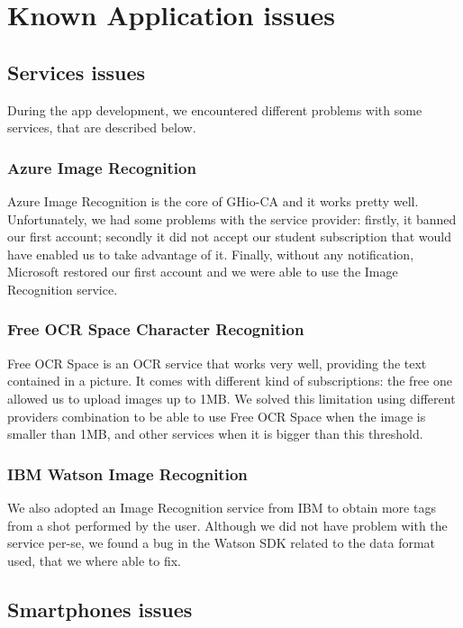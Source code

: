 \section{Known Application issues}
\label{sec:issues}

\subsection{Services issues}

During the app development, we encountered different problems with some services, 
that are described below.

\subsubsection{Azure Image Recognition}

Azure Image Recognition is the core of GHio-CA and it works pretty well. 
Unfortunately, we had some problems with the service provider: firstly, it 
banned our first account; secondly it did not accept our student subscription 
that would have enabled us to take advantage of it. Finally, without any 
notification, Microsoft restored our first account and we were able to use the 
Image Recognition service.

\subsubsection{Free OCR Space Character Recognition}

Free OCR Space is an OCR service that works very well, providing the text 
contained in a picture. It comes with different kind of subscriptions: the 
free one allowed us to upload images up to 1MB. We solved this limitation 
using different providers combination to be able to use Free OCR Space when 
the image is smaller than 1MB, and other services when it is bigger than this 
threshold.

\subsubsection{IBM Watson Image Recognition}

We also adopted an Image Recognition service from IBM to obtain more 
tags from a shot performed by the user. Although we did not have problem with 
the service per-se, we found a bug in the Watson SDK related to the data 
format used, that we where able to fix.

\subsection{Smartphones issues}

